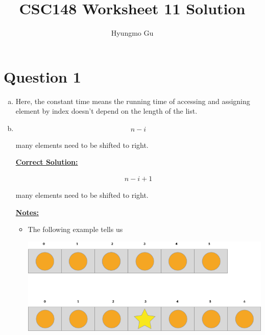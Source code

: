 \documentclass[12pt]{article}
\begin{document}
\title{CSC148 Worksheet 11 Solution}
\author{Hyungmo Gu}
\maketitle

\section*{Question 1}
\begin{enumerate}[a.]
    \item Here, the constant time means the running time of accessing and
    assigning element by index doesn't depend on the length of the list.

    \item

    \begin{align*}
        n -i
    \end{align*}

    many elements need to be shifted to right.

    \bigskip

    \begin{mdframed}
        \underline{\textbf{Correct Solution:}}

        \bigskip

        \color{red}
        \begin{align*}
            n - i + 1
        \end{align*}
        \color{black}

        many elements need to be shifted to right.
    \end{mdframed}

    \bigskip

    \underline{\textbf{Notes:}}

    \bigskip

    \begin{itemize}
        \item

        The following example tells us

        \begin{center}
        \includegraphics[width=0.8 \linewidth]{images/worksheet_11_q1b_notes.png}
        \end{center}


\end{itemize}
\end{enumerate}
\end{document}
